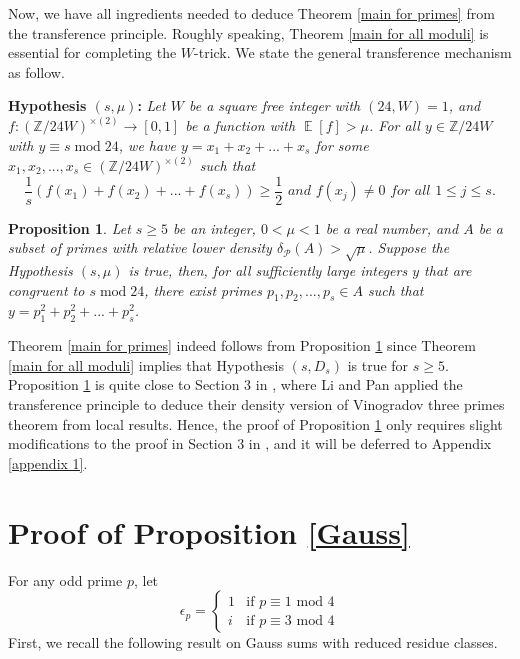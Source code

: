 \documentclass[11pt]{amsart}
\theoremstyle{plain} %
\newtheorem{prop}[thm]{Proposition}
\theoremstyle{remark}
\numberwithin{equation}{section}
\newcommand{\E}{\mathop{\mathbb{E}}}
\newcommand{\Z}{\mathbb{Z}}
\begin{document}
Now, we have all ingredients needed to deduce Theorem \ref{main for primes} from the transference principle. Roughly speaking, Theorem \ref{main for all moduli} is essential for completing the $W$-trick. We state the general transference mechanism as follow.

\noindent\textbf{Hypothesis $(s,\mu)$:} \textit{Let $W$ be a square free integer with $(24,W)=1$, and $f:(\Z/24W)^{\times(2)}\longrightarrow[0,1]$ be a function with $\E[f]>\mu$. For all $y\in \Z/24W$ with $y\equiv s\; \mathrm{mod}\;24$, we have $y=x_1+x_2+...+x_s$ for some $x_1,x_2,...,x_s\in (\Z/24W)^{\times(2)}$ such that}
\begin{equation*}
    \textit{$\frac{1}{s}(f(x_1)+f(x_2)+...+f(x_s))\geq \frac{1}{2}$ and $f(x_j)\neq 0$ for all $1\leq j \leq s$.}
\end{equation*}

\begin{prop}\label{reduction to local problems}
    Let $s\geq 5$ be an integer, $0<\mu<1$ be a real number, and $A$ be a subset of primes with relative lower density $\delta_{\mathcal{P}}(A)>\sqrt{\mu}$. Suppose the Hypothesis $(s,\mu)$ is true, then, for all sufficiently large integers $y$ that are congruent to $s\;\mathrm{mod}\;24$, there exist primes $p_1,p_2,...,p_s\in A$ such that $y=p_1^2+p_2^2+...+p_s^2$.
\end{prop}

Theorem \ref{main for primes} indeed follows from Proposition \ref{reduction to local problems} since Theorem \ref{main for all moduli} implies that Hypothesis $(s,D_s)$ is true for $s\geq 5$. Proposition \ref{reduction to local problems} is quite close to Section 3 in \cite{LiPan}, where Li and Pan applied the transference principle to deduce their density version of Vinogradov three primes theorem from local results. Hence, the proof of Proposition \ref{reduction to local problems} only requires slight modifications to the proof in Section 3 in \cite{LiPan}, and it will be deferred to Appendix \ref{appendix 1}. 

\appendix
\section{Proof of Proposition \ref{Gauss}}\label{appendix}
For any odd prime $p$, let
\begin{equation*}
    \epsilon_p=\begin{cases}
        1&\text{if $p\equiv1$ mod $4$}\\
        i&\text{if $p\equiv3$ mod $4$}
    \end{cases}
\end{equation*}
First, we recall the following result on Gauss sums with reduced residue classes.
\end{document}
